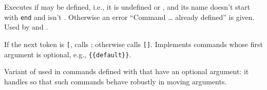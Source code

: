 \documentclass{l3in2edoc}
\begin{document}
\begin{function}[]
  {
    \@ifdefinable
  }
  \begin{syntax}
      
  \end{syntax}
  Executes  if  may be defined, i.e., it is
  undefined or , and its name doesn't start with
  \texttt{end} and isn't . Otherwise an error
  \enquote{Command \ldots{} already defined} is given. Used by
   and .
\end{function}



\begin{function}[]
  {
    \@testopt
  }
  \begin{syntax}
      
  \end{syntax}
  If the next token is \texttt{[}, calls ; otherwise calls
  \texttt{[}\texttt{]}. Implements commands
  whose first argument is optional, e.g.,
  \texttt{\{}\texttt{\{default\}\}}.
\end{function}



\begin{function}[int]
  {
    \@protected@testopt
  }
  Variant of  used in commands defined with
   that have an optional argument: it handles
   so that such commands behave robustly in moving
  arguments.
\end{function}






%




%



%
\end{document}
